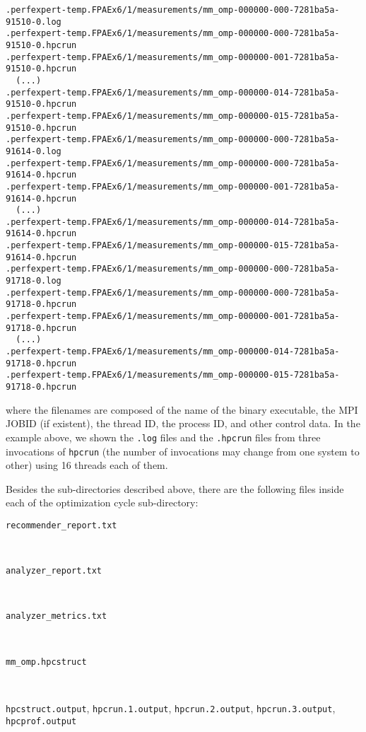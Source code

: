 \begin{verbatim}
.perfexpert-temp.FPAEx6/1/measurements/mm_omp-000000-000-7281ba5a-91510-0.log
.perfexpert-temp.FPAEx6/1/measurements/mm_omp-000000-000-7281ba5a-91510-0.hpcrun
.perfexpert-temp.FPAEx6/1/measurements/mm_omp-000000-001-7281ba5a-91510-0.hpcrun
  (...)
.perfexpert-temp.FPAEx6/1/measurements/mm_omp-000000-014-7281ba5a-91510-0.hpcrun
.perfexpert-temp.FPAEx6/1/measurements/mm_omp-000000-015-7281ba5a-91510-0.hpcrun
.perfexpert-temp.FPAEx6/1/measurements/mm_omp-000000-000-7281ba5a-91614-0.log
.perfexpert-temp.FPAEx6/1/measurements/mm_omp-000000-000-7281ba5a-91614-0.hpcrun
.perfexpert-temp.FPAEx6/1/measurements/mm_omp-000000-001-7281ba5a-91614-0.hpcrun
  (...)
.perfexpert-temp.FPAEx6/1/measurements/mm_omp-000000-014-7281ba5a-91614-0.hpcrun
.perfexpert-temp.FPAEx6/1/measurements/mm_omp-000000-015-7281ba5a-91614-0.hpcrun
.perfexpert-temp.FPAEx6/1/measurements/mm_omp-000000-000-7281ba5a-91718-0.log
.perfexpert-temp.FPAEx6/1/measurements/mm_omp-000000-000-7281ba5a-91718-0.hpcrun
.perfexpert-temp.FPAEx6/1/measurements/mm_omp-000000-001-7281ba5a-91718-0.hpcrun
  (...)
.perfexpert-temp.FPAEx6/1/measurements/mm_omp-000000-014-7281ba5a-91718-0.hpcrun
.perfexpert-temp.FPAEx6/1/measurements/mm_omp-000000-015-7281ba5a-91718-0.hpcrun
\end{verbatim}

\noindent where the filenames are composed of the name of the binary executable, the MPI JOBID (if existent), the thread ID, the process ID, and other control data. In the example above, we shown the \texttt{.log} files and the \texttt{.hpcrun} files from three invocations of \texttt{hpcrun} (the number of invocations may change from one system to other) using 16 threads each of them.

Besides the sub-directories described above, there are the following files inside each of the optimization cycle sub-directory:

\begin{description}
	\item[\texttt{recommender\_report.txt}]\hfill \\

	\item[\texttt{analyzer\_report.txt}]\hfill \\

	\item[\texttt{analyzer\_metrics.txt}]\hfill \\

	\item[\texttt{mm\_omp.hpcstruct}]\hfill \\

	\item[\texttt{hpcstruct.output}, \texttt{hpcrun.1.output}, \texttt{hpcrun.2.output}, \texttt{hpcrun.3.output}, \texttt{hpcprof.output}]\hfill \\

\end{description}

